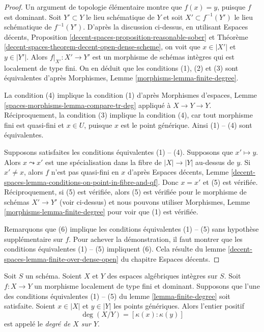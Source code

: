 \begin{proof}
Un argument de topologie élémentaire montre que $f(x) = y$, puisque $f$ est dominant.
Soit $Y' \subset Y$ le lieu schématique de $Y$ et soit
$X' \subset f^{-1}(Y')$ le lieu schématique de $f^{-1}(Y')$.
D'après la discussion ci-dessus, en utilisant
Espaces décents, Proposition \ref{decent-spaces-proposition-reasonable-sober} et
Théorème \ref{decent-spaces-theorem-decent-open-dense-scheme},
on voit que $x \in |X'|$ et $y \in |Y'|$.
Alors $f|_{X'} : X' \to Y'$ est un morphisme de schémas intègres
qui est localement de type fini. On en déduit que les conditions (1), (2) et (3)
sont équivalentes d'après Morphismes, Lemme \ref{morphisms-lemma-finite-degree}.

\medskip\noindent
La condition (4) implique la condition (1) d'après
Morphismes d'espaces, Lemme \ref{spaces-morphisms-lemma-compare-tr-deg}
appliqué à $X \to Y \to Y$.
Réciproquement, la condition (3) implique la condition (4), car tout morphisme
fini est quasi-fini et $x \in U$, puisque $x$
est le point générique. Ainsi (1) -- (4) sont équivalentes.

\medskip\noindent
Supposons satisfaites les conditions équivalentes (1) -- (4). Supposons que
$x' \mapsto y$. Alors $x \leadsto x'$ est une spécialisation dans la
fibre de $|X| \to |Y|$ au-dessus de $y$. Si $x' \not = x$, alors $f$ n'est pas
quasi-fini en $x$ d'après Espaces décents, Lemme
\ref{decent-spaces-lemma-conditions-on-point-in-fibre-and-qf}.
Donc $x = x'$ et (5) est vérifiée. Réciproquement, si (5) est vérifiée, alors
(5) est vérifiée pour le morphisme de schémas $X' \to Y'$ (voir ci-dessus)
et nous pouvons utiliser
Morphismes, Lemme \ref{morphisms-lemma-finite-degree}
pour voir que (1) est vérifiée.

\medskip\noindent
Remarquons que (6) implique les conditions équivalentes (1) -- (5)
sans hypothèse supplémentaire sur $f$. Pour achever la démonstration,
il faut montrer que les conditions équivalentes (1) -- (5) impliquent (6).
Cela résulte du lemme
\ref{decent-spaces-lemma-finite-over-dense-open} du chapitre Espaces décents.
\end{proof}

\begin{definition}
\label{definition-degree}
Soit $S$ un schéma.
Soient $X$ et $Y$ des espaces algébriques intègres sur $S$.
Soit $f : X \to Y$ un morphisme localement de type fini et dominant.
Supposons que l'une des conditions équivalentes (1) -- (5) du
lemme \ref{lemma-finite-degree} soit satisfaite. Soient $x \in |X|$ et $y \in |Y|$
les points génériques. Alors l'entier positif
$$
\deg(X/Y) = [\kappa(x) : \kappa(y)]
$$
est appelé le {\it degré de $X$ sur $Y$}.
\end{definition}

